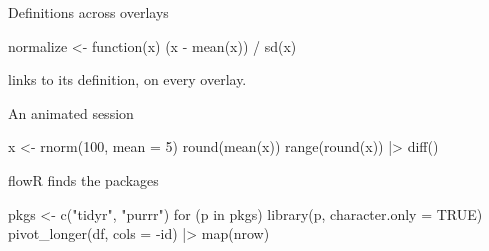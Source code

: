 \documentclass{beamer}
\begin{document}
\begin{frame}[fragile]{Definitions across overlays}
\begin{mr}
normalize <- function(x) {
  (x - mean(x)) / sd(x)
}
\end{mr}
\pause
{} links to its definition, on every overlay.
\end{frame}
\begin{frame}[fragile]{An animated session}
\begin{rsession}
x <- rnorm(100, mean = 5)
round(mean(x))
range(round(x)) |> diff()
\end{rsession}
\end{frame}
\begin{frame}[fragile]{flowR finds the packages}
\begin{mr}
pkgs <- c("tidyr", "purrr")
for (p in pkgs) library(p, character.only = TRUE)
pivot_longer(df, cols = -id) |> map(nrow)
\end{mr}
\end{frame}
\end{document}

